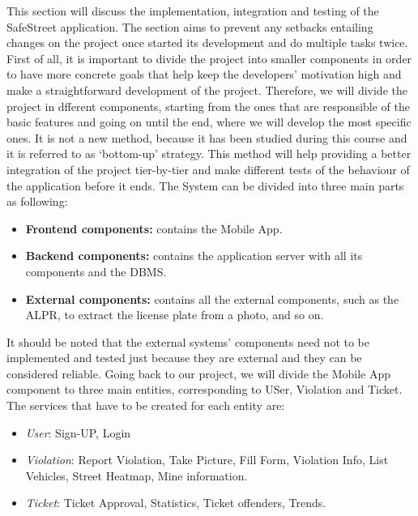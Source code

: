 This section will discuss the implementation, integration and testing of the SafeStreet application. The section aims to prevent any setbacks entailing changes on the project once started its development and do multiple tasks twice. First of all, it is important to divide the project into smaller components in order to have more concrete goals that help keep the developers’ motivation high and make a straightforward development of the project. Therefore, we will divide the project in dfferent components, starting from the ones that are responsible of the basic features and going on until the end, where we will develop the most speciﬁc ones. It is not a new method, because it has been studied during this course and it is referred to as ‘bottom-up’ strategy. This method will help providing a better integration of the project tier-by-tier and make different tests of the behaviour of the application before it ends. The System can be divided into three main parts as following:
\begin{itemize}
    \item \textbf{Frontend components:} contains the Mobile App.
    \item \textbf{Backend components:} contains the application server with all its components and the DBMS.
    \item \textbf{External components:} contains all the external components, such as the ALPR, to extract the license plate from a photo, and so on.
\end{itemize}
 It should be noted that the external systems’ components need not to be implemented and tested just because they are external and they can be considered reliable.
Going back to our project, we will divide the Mobile App component to three main entities, corresponding to USer, Violation and Ticket.
The services that have to be created for each entity are:
\begin{itemize}
\item{} \textit{User}: Sign-UP, Login
\item{} \textit{Violation}: Report Violation, Take Picture, Fill Form, Violation Info, List Vehicles, Street Heatmap, Mine information.
\item{} \textit{Ticket}: Ticket Approval, Statistics, Ticket offenders, Trends.
\end{itemize}


